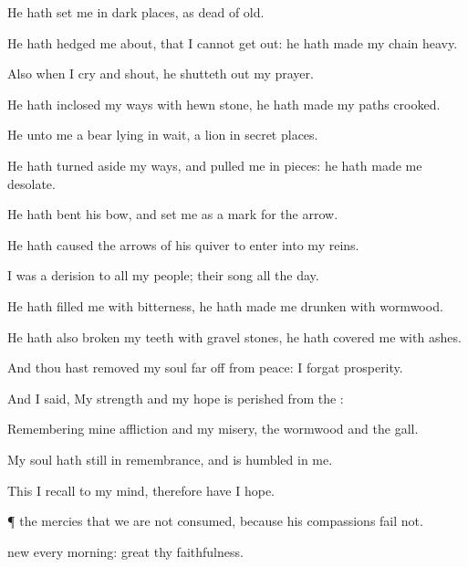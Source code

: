 {He hath
set me in dark
places, as
{}
dead of
old.

He hath
hedged me about, that I cannot get
out: he hath made my
chain
heavy.

Also when I
cry and
shout, he shutteth
out my
prayer.

He hath
inclosed my
ways with hewn
stone, he hath made my
paths
crooked.

He
{} unto me
{} a
bear lying in
wait,
{} a
lion in secret
places.

He hath turned
aside my
ways, and pulled me in
pieces: he hath
made me
desolate.

He hath
bent his
bow, and
set me as a
mark for the
arrow.

He hath caused the
arrows of his
quiver to
enter into my
reins.

I was a
derision to all my
people;
{} their
song all the
day.

He hath
filled me with
bitterness, he hath made me
drunken with
wormwood.

He hath also
broken my
teeth with gravel
stones, he hath
covered me with
ashes.

And thou hast
removed my
soul far
off from
peace: I
forgat
prosperity.

And I
said, My
strength and my
hope is
perished from the
{}:

Remembering mine
affliction and my
misery, the
wormwood and the
gall.

My
soul hath
{}
still in
remembrance, and is
humbled in me.


\par }{\PP {}This I
recall to my
mind, therefore have I
hope.


\par }{\PP {}¶
{} the
{}
mercies that we are not
consumed, because his
compassions
fail not.

new every
morning:
great
{} thy
faithfulness.

}
